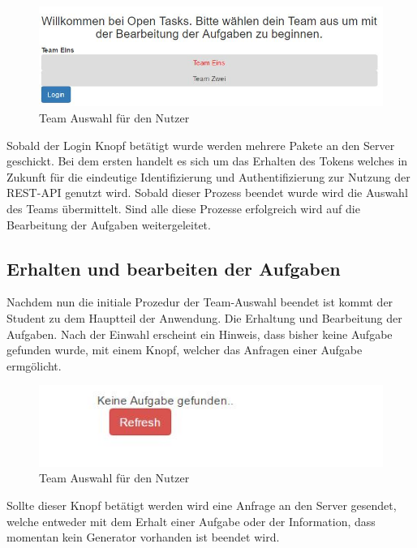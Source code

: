 \begin{figure}[htp]     %
\centering
\includegraphics[width=1\textwidth]{bilder/UserLogin} 
\caption[Login für den Nutzer / Teamauswahl]{Team Auswahl für den Nutzer}
\end{figure} 

Sobald der Login Knopf betätigt wurde werden mehrere Pakete an den Server geschickt. Bei dem ersten handelt es sich um das Erhalten des Tokens welches in Zukunft für die eindeutige Identifizierung und Authentifizierung zur Nutzung der REST-API genutzt wird. Sobald dieser Prozess beendet wurde wird die Auswahl des Teams übermittelt. Sind alle diese Prozesse erfolgreich wird auf die Bearbeitung der Aufgaben weitergeleitet. 

\subsection{Erhalten und bearbeiten der Aufgaben}

Nachdem nun die initiale Prozedur der Team-Auswahl beendet ist kommt der Student zu dem Hauptteil der Anwendung. Die Erhaltung und Bearbeitung der Aufgaben. Nach der Einwahl erscheint ein Hinweis, dass bisher keine Aufgabe gefunden wurde, mit einem Knopf, welcher das Anfragen einer Aufgabe ermgölicht. \\
\begin{figure}[htp]     %
\centering
\includegraphics[width=1\textwidth]{bilder/NoTask} 
\caption[Login für den Nutzer / Teamauswahl]{Team Auswahl für den Nutzer}
\end{figure} 

Sollte dieser Knopf betätigt werden wird eine Anfrage an den Server gesendet, welche entweder mit dem Erhalt einer Aufgabe oder der Information, dass momentan kein Generator vorhanden ist beendet wird. \\

